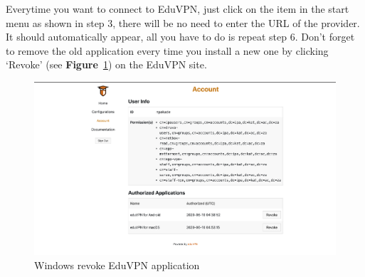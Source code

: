 Everytime you want to connect to EduVPN, just click on the item in the start menu as shown in step 3, there will be no need to  enter the URL of the provider. It should automatically appear, all you have to do is repeat step 6.
Don’t forget to remove the old application every time you install a new one by clicking ‘Revoke’ (see \textbf{Figure}~\ref{fig:image32}) on the EduVPN site. 
\begin{figure}[!thb]
	\centering
	\includegraphics[scale=0.3]{Chapters/images/image32.png}
	
	\caption{Windows revoke EduVPN application }
	\label{fig:image32}
\end{figure}
